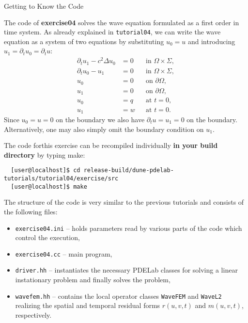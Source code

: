 \documentclass[12pt,a4paper]{article}
\begin{document}
\begin{Exercise}{Getting to Know the Code}

  \lstset{language=bash}

  The code of \textbf{exercise04} solves the wave equation formulated as a first order in time system. As already explained in \lstinline{tutorial04}, we can write the wave equation as a system of two equations by substituting $u_0=u$ and introducing $u_1=\partial_t u_0 =\partial_t u$:
\begin{subequations}
\label{eq:SystemForm1}
\begin{align}
\partial_t u_1 - c^2\Delta u_0 &=0 &&\text{in $\Omega\times\Sigma$}, \label{eq:2a}\\
\partial_t u_0 - u_1 &=0 &&\text{in $\Omega\times\Sigma$}, \label{eq:2b}\\
u_0 &= 0 &&\text{on $\partial\Omega$},\\
u_1 &= 0 &&\text{on $\partial\Omega$},\\
u_0 &= q &&\text{at $t=0$},\\
u_1 &= w &&\text{at $t=0$}.
\end{align}
\end{subequations}
Since $u_0=u=0$ on the boundary we also have $\partial_t u = u_1 = 0$ on the boundary.
Alternatively, one may also simply omit the boundary condition on $u_1$.


  The code forthis exercise can be recompiled individually \textbf{in
    your build directory} by typing make:
  \begin{lstlisting}
  [user@localhost]$ cd release-build/dune-pdelab-tutorials/tutorial04/exercise/src
  [user@localhost]$ make
  \end{lstlisting}

  The structure of the code is very similar to the previous tutorials and
  consists of the following files:
  \begin{itemize}
  \item \lstinline!exercise04.ini! -- holds parameters read by various parts of the code which control the execution,
  \item \lstinline!exercise04.cc! -- main program,
  \item \lstinline!driver.hh! -- instantiates the necessary PDELab classes for solving a linear instationary problem and finally solves the problem,
  \item \lstinline!wavefem.hh! -- contains the local operator classes \lstinline!WaveFEM! and \lstinline!WaveL2! realizing the spatial and temporal residual forms $r(u,v,t)$ and $m(u,v,t)$, respectively.
  \end{itemize}


\end{Exercise}
\end{document}
